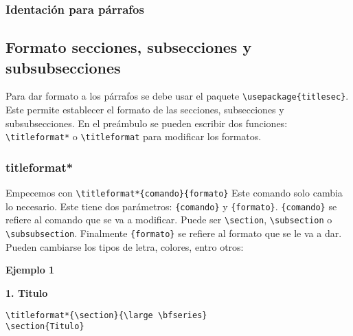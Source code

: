 	\subsubsection{Identación para párrafos}
	
	\subsection{Formato secciones, subsecciones y subsubsecciones}
		
	Para dar formato a los párrafos se debe usar el paquete \verb|\usepackage{titlesec}|. Este permite establecer el formato de las secciones, subsecciones y subsubsecciones. En el preámbulo se pueden escribir dos funciones: \verb|\titleformat*| o \verb|\titleformat| para modificar los formatos.
	
	\subsubsection{titleformat*}
	
	Empecemos con \verb|\titleformat*{comando}{formato}| Este comando solo cambia lo necesario. Este tiene dos parámetros: \verb|{comando}| y \verb|{formato}|. \verb|{comando}| se refiere al comando que se va a modificar. Puede ser \verb|\section|, \verb|\subsection| o \verb|\subsubsection|. Finalmente \verb|{formato}| se refiere al formato que se le va a dar. Pueden cambiarse los tipos de letra, colores, entro otros:
	
	\textbf{Ejemplo 1}
	
	\noindent
	{\large \textbf{1. Titulo}}	
	
	\begin{myquote}
		\begin{lstlisting}
\titleformat*{\section}{\large \bfseries} 
\section{Titulo}
		\end{lstlisting}
	\end{myquote} 

